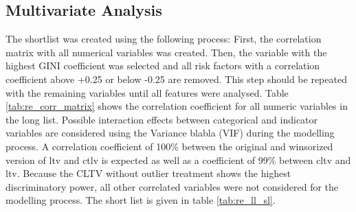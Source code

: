 \subsection{Multivariate Analysis}

The shortlist was created using the following process: First, the correlation matrix with all numerical variables was created. Then, the variable with the highest GINI coefficient was selected and all risk factors with a correlation coefficient above +0.25 or below -0.25 are removed. This step should be repeated with the remaining variables until all features were analysed. 
Table \ref{tab:re_corr_matrix} shows the correlation coefficient for all numeric variables in the long list. Possible interaction effects between categorical and indicator variables are considered using the Variance blabla (VIF) during the modelling process. A correlation coefficient of 100\% between the original and winsorized version of ltv and ctlv is expected as well as a coefficient of 99\% between cltv and ltv. Because the CLTV without outlier treatment shows the highest discriminatory power, all other correlated variables were not considered for the modelling process. The short list is given in table \ref{tab:re_ll_sl}.

\begin{table}[h!]
\caption{Correlation matrix}
\label{tab:re_corr_matrix}   
\end{table}

